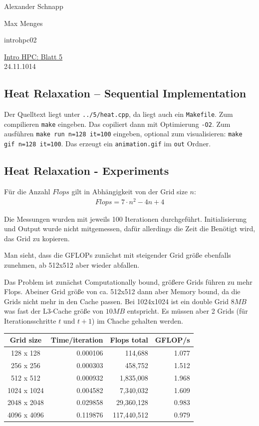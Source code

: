 \documentclass[a4paper,11pt]{scrartcl}
\begin{document}
\hfill Alexander Schnapp

\hfill Max Menges

\hfill introhpc02

\begin{center}
\underline{\Huge{Intro HPC: Blatt 5}}\\
\large{24.11.1014}\\
\end{center}

\subsection{Heat Relaxation -- Sequential Implementation}

Der Quelltext liegt unter \verb+../5/heat.cpp+, da liegt auch ein \verb+Makefile+. Zum compilieren \verb+make+ eingeben. Das copiliert dann mit Optimierung \verb+-O2+. Zum ausführen \verb+make run n=128 it=100+ eingeben, optional zum visualisieren: \verb+make gif n=128 it=100+. Das erzeugt ein \verb+animation.gif+ im \verb+out+ Ordner.

\subsection{Heat Relaxation - Experiments}

Für die Anzahl $Flops$ gilt in Abhängigkeit von der Grid size $n$:
\begin{align*}
    Flops = 7 \cdot n^2 - 4n + 4
\end{align*}

Die Messungen wurden mit jeweils 100 Iterationen durchgeführt. Initialisierung und Output wurde nicht mitgemessen, dafür allerdings die Zeit die Benötigt wird, das Grid zu kopieren. 

Man sieht, dass die GFLOPs zunächst mit steigender Grid größe ebenfalls zunehmen, ab 512x512 aber wieder abfallen. 

Das Problem ist zunächst Computationally bound, größere Grids führen zu mehr Flops. Abeiner Grid größe von ca. 512x512 dann aber Memory bound, da die Grids nicht mehr in den Cache passen. Bei 1024x1024 ist ein double Grid $8MB$ was fast der L3-Cache größe von $10MB$ entspricht. Es müssen aber 2 Grids (für Iterationsschritte $t$ und $t+1$) im Chache gehalten werden. \\


\begin{tabular}{|c|r|r|r|}
\hline 
\multicolumn{1}{|c|}{Grid size} & \multicolumn{1}{|c|}{Time/iteration} & \multicolumn{1}{|c|}{Flops total} & \multicolumn{1}{|c|}{GFLOP/s} \\
\hline
128 x 128   &0.000106 &114,688 & 1.077\\
\hline
256 x 256   &0.000303 &458,752 & 1.512 \\
\hline
512 x 512   &0.000932 &1,835,008 & 1.968 \\
\hline
1024 x 1024 &0.004582  &7,340,032 & 1.609 \\
\hline
2048 x 2048 &0.029858 & 29,360,128&  0.983\\
\hline
4096 x 4096 &0.119876 & 117,440,512& 0.979 \\
\hline
\end{tabular} 
\end{document}

